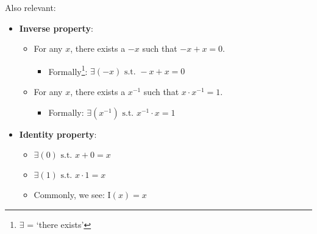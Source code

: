 \noindent Also relevant:

\begin{itemize}
    \itemsep-0.5em 
    \item \textbf{Inverse property}: 
    \begin{itemize}
        \item For any $x$, there exists a $-x$ such that $-x + x = 0$.
        \begin{itemize}
            \item Formally\footnote{$\exists$ = `there exists'}: $\exists(-x) \text{ s.t. } -x + x = 0$
        \end{itemize}
        \item For any $x$, there exists a $x^{-1}$ such that $x \cdot x^{-1} = 1$.
        \begin{itemize}
            \item Formally: $\exists(x^{-1}) \text{ s.t. } x^{-1} \cdot x = 1$
        \end{itemize}
    \end{itemize}

    \item \textbf{Identity property}:
    \begin{itemize}
        \item $\exists(0) \text{ s.t. } x + 0 = x$
        \item $\exists(1) \text{ s.t. } x \cdot 1 = x$
        \item Commonly, we see: $\text{I}(x) = x$
    \end{itemize}

\end{itemize}